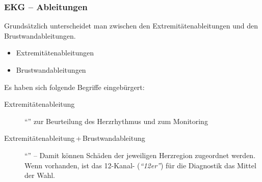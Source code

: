  



\subsubsection{EKG -- Ableitungen}
\label{topic:ekg-ableitungen}
Grundsätzlich unterscheidet man zwischen den Extremitätenableitungen
und den Brustwandableitungen. 

\begin{itemize}
    \item Extremitätenableitungen
    \item Brustwandableitungen
\end{itemize}

Es haben sich folgende Begriffe eingebürgert:

\begin{description}
    \item[Extremitätenableitung] "`"'
    zur Beurteilung des Herzrhythmus und zum Monitoring
    \item[Extremitätenableitung\,+\,Brustwandableitung]
    "`"' -- Damit können Schäden der
    jeweiligen Herzregion zugeordnet werden. Wenn vorhanden,
    ist das 12-Kanal- (\emph{"`12er"'}) für die
    Diagnostik das Mittel der Wahl. 
\end{description}

